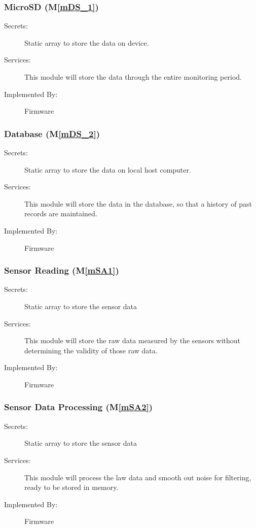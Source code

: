 \documentclass[12pt, titlepage]{article}
\newcommand{\mref}[1]{M\ref{#1}}
\begin{document}
\subsubsection{MicroSD (\mref{mDS_1})}
\begin{description}
  \item[Secrets:] Static array to store the data on device.
  \item[Services:] This module will store the data through the entire monitoring period.
  \item[Implemented By:] Firmware
\end{description}

\pagebreak

\subsubsection{Database (\mref{mDS_2})}
\begin{description}
  \item[Secrets:] Static array to store the data on local host computer.
  \item[Services:] This module will store the data in the database, so that a history of past records are maintained.
  \item[Implemented By:] Firmware
\end{description}

\subsubsection{Sensor Reading (\mref{mSA1})}
\begin{description}
  \item[Secrets:] Static array to store the sensor data
  \item[Services:] This module will store the raw data measured by the sensors without determining the validity of those raw data.
  \item[Implemented By:] Firmware
\end{description}

\subsubsection{Sensor Data Processing (\mref{mSA2})}
\begin{description}
  \item[Secrets:] Static array to store the sensor data
  \item[Services:] This module will process the law data and smooth out noise for filtering, ready to be stored in memory.
  \item[Implemented By:] Firmware
\end{description}
\end{document}
